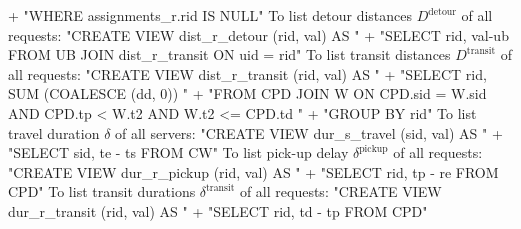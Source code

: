   + "WHERE assignments_r.rid IS NULL"
\nwendcode{}\nwdocspar
To list detour distances $D^\textrm{detour}$ of all requests:
\nwenddocs{}\endmoddef{}
"CREATE VIEW dist_r_detour (rid, val) AS "
  + "SELECT rid, val-ub FROM UB JOIN dist_r_transit ON uid = rid"
\nwendcode{}\nwdocspar
To list transit distances $D^\textrm{transit}$ of all requests:
\nwenddocs{}\endmoddef{}
"CREATE VIEW dist_r_transit (rid, val) AS "
  + "SELECT rid, SUM (COALESCE (dd, 0)) "
  + "FROM CPD JOIN W ON CPD.sid = W.sid AND CPD.tp < W.t2 AND W.t2 <= CPD.td "
  + "GROUP BY rid"
\nwendcode{}\nwdocspar
To list travel duration $\delta$ of all servers:
\nwenddocs{}\endmoddef{}
"CREATE VIEW dur_s_travel (sid, val) AS "
  + "SELECT sid, te - ts FROM CW"
\nwendcode{}\nwdocspar
To list pick-up delay $\delta^\textrm{pickup}$ of all requests:
\nwenddocs{}\endmoddef{}
"CREATE VIEW dur_r_pickup (rid, val) AS "
  + "SELECT rid, tp - re FROM CPD"
\nwendcode{}\nwdocspar
To list transit durations $\delta^\textrm{transit}$ of all requests:
\nwenddocs{}\endmoddef{}
"CREATE VIEW dur_r_transit (rid, val) AS "
  + "SELECT rid, td - tp FROM CPD"
